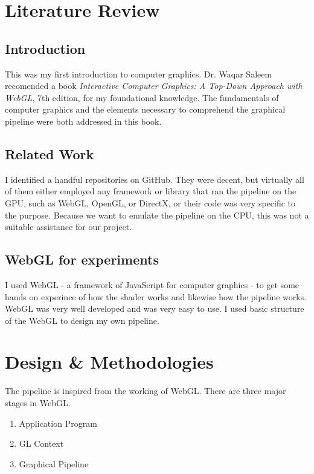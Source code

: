 \documentclass[a4paper]{article}
\theoremstyle{mytheoremstyle}
\theoremstyle{mytheoremstyle}
\theoremstyle{myproblemstyle}
\begin{document}
\section{Literature Review}

\subsection{Introduction}
This was my first introduction to computer graphics. Dr. Waqar Saleem recomended a book \emph{Interactive Computer Graphics: A Top-Down Approach with WebGL}\cite{book}, 7th edition, for my foundational knowledge. The fundamentals of computer graphics and the elements necessary to comprehend the graphical pipeline were both addressed in this book.

\subsection{Related Work}
I identified a handful repositories on GitHub. They were decent, but virtually all of them either employed any framework or library that ran the pipeline on the GPU, such as WebGL, OpenGL, or DirectX, or their code was very specific to the purpose. Because we want to emulate the pipeline on the CPU, this was not a suitable assistance for our project.

\subsection{WebGL for experiments}
I used WebGL - a framework of JavaScript for computer graphics - to get some hands on experince of how the shader works and likewise how the pipeline works. WebGL was very well developed and was very easy to use. I used basic structure of the WebGL to design my own pipeline.

\newpage

\section{Design \& Methodologies}

The pipeline is inspired from the working of WebGL. There are three major stages in WebGL.
\begin{enumerate}
    \item Application Program
    \item GL Context
    \item Graphical Pipeline
\end{enumerate}
\end{document}
